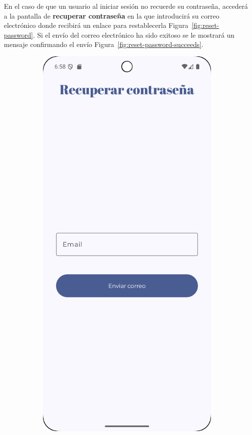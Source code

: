 \clearpage
En el caso de que un usuario al iniciar sesión no recuerde su contraseña, accederá a la pantalla de \textbf{recuperar contraseña} en la que introducirá su correo electrónico donde recibirá un enlace para restablecerla Figura~\ref{fig:reset-password}. Si el envío del correo electrónico ha sido exitoso se le mostrará un mensaje confirmando el envío Figura~\ref{fig:reset-password-succeeds}.

\begin{figure}[H]
    \centering

    \begin{subfigure}[b]{0.3\textwidth}
      \includegraphics[width=\textwidth]{./img/manual/sent_reset_password_email.png}

\end{subfigure}
\end{figure}

